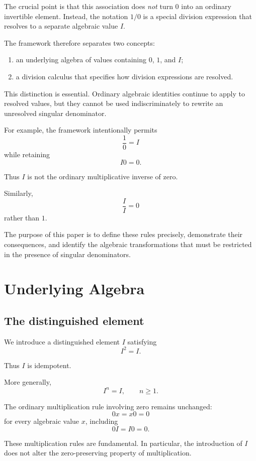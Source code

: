 \documentclass[11pt,a4paper]{article}
\begin{document}
The crucial point is that this association does \emph{not} turn $0$ into an
ordinary invertible element. Instead, the notation $1/0$ is a special
division expression that resolves to a separate algebraic value $I$.

The framework therefore separates two concepts:

\begin{enumerate}
    \item an underlying algebra of values containing $0$, $1$, and $I$;
    \item a division calculus that specifies how division expressions are
    resolved.
\end{enumerate}

This distinction is essential. Ordinary algebraic identities continue to
apply to resolved values, but they cannot be used indiscriminately to
rewrite an unresolved singular denominator.

For example, the framework intentionally permits
\[
\frac{1}{0}=I
\]
while retaining
\[
I0=0.
\]

Thus $I$ is not the ordinary multiplicative inverse of zero.

Similarly,
\[
\frac{I}{I}=0
\]
rather than $1$.

The purpose of this paper is to define these rules precisely, demonstrate
their consequences, and identify the algebraic transformations that must be
restricted in the presence of singular denominators.

\section{Underlying Algebra}

\subsection{The distinguished element}

We introduce a distinguished element $I$ satisfying
\[
I^2=I.
\]

Thus $I$ is idempotent.

More generally,
\[
I^n=I,\qquad n\geq1.
\]

The ordinary multiplication rule involving zero remains unchanged:
\[
0x=x0=0
\]
for every algebraic value $x$, including
\[
0I=I0=0.
\]

These multiplication rules are fundamental. In particular, the introduction
of $I$ does not alter the zero-preserving property of multiplication.
\end{document}
